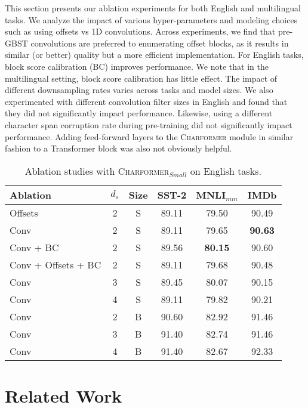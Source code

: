 \documentclass{article} \usepackage{iclr2022_conference,times}
\newcommand{\charformer}{\textsc{Charformer}\xspace}
\newcommand{\charformersmall}{\textsc{Charformer}$_{Small}$\xspace}
\begin{document}
\label{sec:ablations}
This section presents our ablation experiments for both English and multilingual tasks. We analyze the impact of various hyper-parameters and modeling choices such as using offsets vs 1D convolutions. Across experiments, we find that pre-GBST convolutions are preferred to enumerating offset blocks, as it results in similar (or better) quality but a more efficient implementation. For English tasks, block score calibration (BC) improves performance. We note that in the multilingual setting, block score calibration has little effect. The impact of different downsampling rates varies across tasks and model sizes. We also experimented with different convolution filter sizes in English and found that they did not significantly impact performance. Likewise, using a different character span corruption rate during pre-training did not significantly impact performance. Adding feed-forward layers to the \charformer module in similar fashion to a Transformer block was also not obviously helpful.

\begin{table}[H]
\small
    \centering
    \caption{Ablation studies with \charformersmall on English tasks.}
    \begin{tabular}{l|c|c|ccc}
    \toprule
     Ablation    & $d_s$ &Size &   SST-2 & MNLI$_{mm}$ & IMDb\\
     \midrule
     Offsets & 2 & S & 89.11 & 79.50 & 90.49 \\
     Conv  & 2 & S & 89.11 & 79.65 &  \textbf{90.63}\\ 
     Conv + BC & 2 & S &89.56 & \textbf{80.15} & 90.60\\
Conv + Offsets + BC &2 & S &  89.11 & 79.68 &90.48 \\
\midrule
      Conv & 3 & S &89.45 & 80.07  & 90.15\\
Conv & 4 & S & 89.11 & 79.82 &90.21 \\
      \midrule
      Conv & 2 & B & 90.60 & 82.92 & 91.46 \\ 
      Conv & 3 & B & 91.40 & 82.74 & 91.46\\
      Conv & 4 & B & 91.40 & 82.67 & 92.33\\
      \bottomrule
    \end{tabular}
    \label{tab:my_label}
\end{table}




\section{Related Work} \label{sec:related_work}
\end{document}
